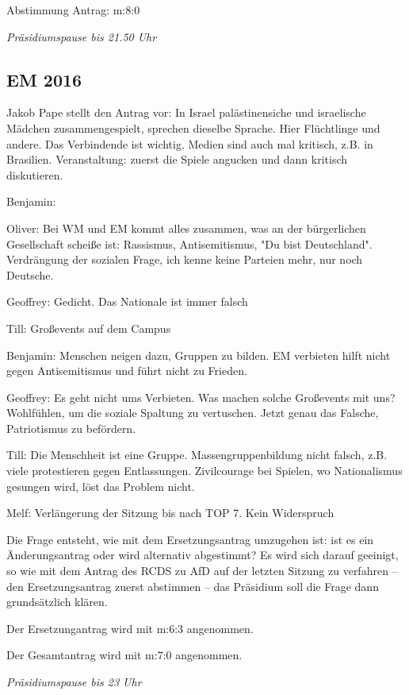 \documentclass[ngerman,headheight=70pt]{scrartcl}
\begin{document}
    Abstimmung Antrag: m:8:0

    \textit{Präsidiumspause bis 21.50 Uhr}

    \subsection{EM 2016}

    Jakob Pape stellt den Antrag vor: In Israel palästinensiche und israelische
    Mädchen zusammengespielt, sprechen dieselbe Sprache. Hier Flüchtlinge und
    andere. Das Verbindende ist wichtig.
    Medien sind auch mal kritisch, z.B. in Brasilien. Veranstaltung: zuerst die
    Spiele angucken und dann kritisch diskutieren.

    Benjamin:

    Oliver: Bei WM und EM kommt alles zusammen, was an der bürgerlichen
    Gesellschaft scheiße ist: Rassismus, Antisemitismus, "Du bist Deutschland".
    Verdrängung der sozialen Frage, ich kenne keine Parteien mehr, nur noch Deutsche.

    Geoffrey: Gedicht. Das Nationale ist immer falsch

    Till: Großevents auf dem Campus

    Benjamin: Menschen neigen dazu, Gruppen zu bilden. EM verbieten hilft nicht
    gegen Antisemitismus und führt nicht zu Frieden.

    Geoffrey: Es geht nicht ums Verbieten. Was machen solche Großevents mit uns?
    Wohlfühlen, um die soziale Spaltung zu vertuschen. Jetzt genau das Falsche,
    Patriotismus zu befördern.

    Till: Die Menschheit ist eine Gruppe. Massengruppenbildung nicht falsch, z.B.
    viele protestieren gegen Entlassungen.
    Zivilcourage bei Spielen, wo Nationalismus gesungen wird, löst das Problem nicht.

    Melf: Verlängerung der Sitzung bis nach TOP 7. Kein Widerspruch

    Die Frage entsteht, wie mit dem Ersetzungsantrag umzugehen ist: ist es ein
    Änderungsantrag oder wird alternativ abgestimmt?
    Es wird sich darauf geeinigt, so wie mit dem Antrag des RCDS zu AfD auf der
    letzten Sitzung zu verfahren – den Ersetzungsantrag zuerst abstimmen – das
    Präsidium soll die Frage dann grundsätzlich klären.

    Der Ersetzungantrag wird mit m:6:3 angenommen.

    Der Gesamtantrag wird mit m:7:0 angenommen.

    \textit{Präsidiumspause bis 23 Uhr}
\end{document}
